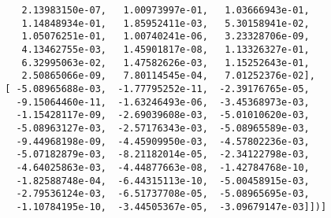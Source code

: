 \documentclass[11pt,a4j,fleqn]{jarticle}
\begin{document}
\begin{verbatim}
          2.13983150e-07,   1.00973997e-01,   1.03666943e-01,
          1.14848934e-01,   1.85952411e-03,   5.30158941e-02,
          1.05076251e-01,   1.00740241e-06,   3.23328706e-09,
          4.13462755e-03,   1.45901817e-08,   1.13326327e-01,
          6.32995063e-02,   1.47582626e-03,   1.15252643e-01,
          2.50865066e-09,   7.80114545e-04,   7.01252376e-02],
       [ -5.08965688e-03,  -1.77795252e-11,  -2.39176765e-05,
         -9.15064460e-11,  -1.63246493e-06,  -3.45368973e-03,
         -1.15428117e-09,  -2.69039608e-03,  -5.01010620e-03,
         -5.08963127e-03,  -2.57176343e-03,  -5.08965589e-03,
         -9.44968198e-09,  -4.45909950e-03,  -4.57802236e-03,
         -5.07182879e-03,  -8.21182014e-05,  -2.34122798e-03,
         -4.64025863e-03,  -4.44877663e-08,  -1.42784768e-10,
         -1.82588748e-04,  -6.44315113e-10,  -5.00458915e-03,
         -2.79536124e-03,  -6.51737708e-05,  -5.08965695e-03,
         -1.10784195e-10,  -3.44505367e-05,  -3.09679147e-03]])]

\end{verbatim}
\end{document}
